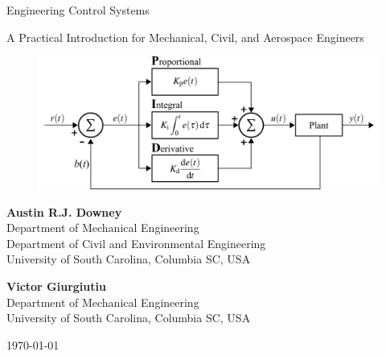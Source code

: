 \documentclass[12pt,letter]{article}
\begin{document}
\begin{center}
	{\fontsize{40}{50}\selectfont Engineering Control Systems}

	\vspace{1cm}


	
	\begin{center}
	\begin{minipage}{0.75\textwidth}
		\centering
       	{\LARGE{} A Practical Introduction for Mechanical, Civil, and Aerospace Engineers}
	\end{minipage}
	\end{center}
	
	\vspace{2cm}
	
	\begin{figure}[H]
		\includegraphics[width=6.5in]{figures/controller_PID.png}
		\label{fig:title_figure}
	\end{figure} 
	
	\vspace{2cm}
	
	\textbf{Austin R.J. Downey}\\ Department of Mechanical Engineering \\ Department of Civil and Environmental Engineering \\ University of South Carolina, Columbia SC, USA 
	
	\vspace{1.5cm}
	
	\textbf{Victor Giurgiutiu}\\  Department of Mechanical Engineering \\ University of South Carolina, Columbia SC, USA 
	
	\vspace{1cm}
	
	\today
\end{center}

\pagebreak
\end{document}
